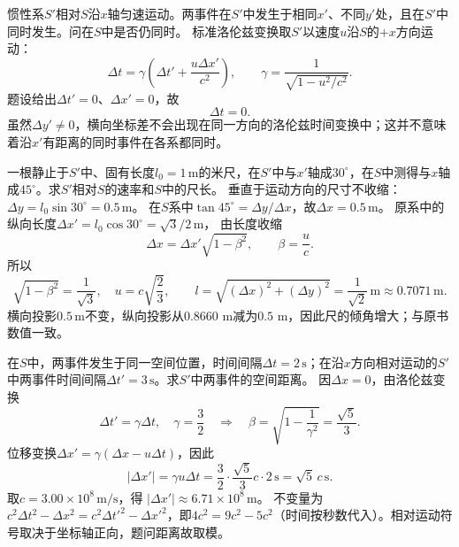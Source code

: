 
\problemtext 惯性系$S'$相对$S$沿$x$轴匀速运动。两事件在$S'$中发生于相同$x'$、不同$y'$处，且在$S'$中同时发生。问在$S$中是否仍同时。
\workings
标准洛伦兹变换取$S'$以速度$u$沿$S$的$+x$方向运动：
\[
\Delta t=\gamma\left(\Delta t'+\frac{u\Delta x'}{c^2}\right),
\qquad
\gamma=\frac1{\sqrt{1-u^2/c^2}}.
\]
题设给出$\Delta t'=0$、$\Delta x'=0$，故
\[
\boxed{\Delta t=0}.
\]
\crosscheck 虽然$\Delta y'\ne0$，横向坐标差不会出现在同一方向的洛伦兹时间变换中；这并不意味着沿$x'$有距离的同时事件在各系都同时。

\problemtext 一根静止于$S'$中、固有长度$l_0=1\,\mathrm m$的米尺，在$S'$中与$x'$轴成$30^\circ$，在$S$中测得与$x$轴成$45^\circ$。求$S'$相对$S$的速率和$S$中的尺长。
\workings
垂直于运动方向的尺寸不收缩：
$\Delta y=l_0\sin30^\circ=0.5\,\mathrm m$。
在$S$系中$\tan45^\circ=\Delta y/\Delta x$，故$\Delta x=0.5\,\mathrm m$。
原系中的纵向长度$\Delta x'=l_0\cos30^\circ=\sqrt3/2\,\mathrm m$，
由长度收缩
\[
\Delta x=\Delta x'\sqrt{1-\beta^2},\qquad \beta=\frac uc.
\]
所以
\[
\sqrt{1-\beta^2}=\frac{1}{\sqrt3},
\quad
\boxed{u=c\sqrt{\frac23}},
\qquad
\boxed{l=\sqrt{(\Delta x)^2+(\Delta y)^2}
=\frac1{\sqrt2}\,\mathrm m\approx0.7071\,\mathrm m}.
\]
\crosscheck 横向投影$0.5\,\mathrm m$不变，纵向投影从$0.8660$ m减为$0.5$ m，因此尺的倾角增大；与原书数值一致。

\problemtext 在$S$中，两事件发生于同一空间位置，时间间隔$\Delta t=2\,\mathrm s$；在沿$x$方向相对运动的$S'$中两事件时间间隔$\Delta t'=3\,\mathrm s$。求$S'$中两事件的空间距离。
\workings
因$\Delta x=0$，由洛伦兹变换
\[
\Delta t'=\gamma\Delta t,\quad
\gamma=\frac{3}{2}
\quad\Longrightarrow\quad
\beta=\sqrt{1-\frac1{\gamma^2}}=\frac{\sqrt5}{3}.
\]
位移变换$\Delta x'=\gamma(\Delta x-u\Delta t)$，因此
\[
\boxed{|\Delta x'|
=\gamma u\Delta t
=\frac32\cdot\frac{\sqrt5}{3}c\cdot2\,\mathrm s
=\sqrt5\,c\,\mathrm s}.
\]
取$c=3.00\times10^8\,\mathrm{m/s}$，得
$\boxed{|\Delta x'|\approx6.71\times10^8\,\mathrm m}$。
\crosscheck 不变量为
$c^2\Delta t^2-\Delta x^2
=c^2\Delta t'^2-\Delta x'^2$，即$4c^2=9c^2-5c^2$（时间按秒数代入）。相对运动符号取决于坐标轴正向，题问距离故取模。

